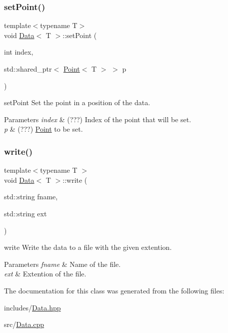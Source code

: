 \subsubsection{\texorpdfstring{set\+Point()}{setPoint()}}
{\footnotesize\ttfamily template$<$typename T$>$ \\
void \mbox{\hyperlink{class_data}{Data}}$<$ T $>$\+::set\+Point (\begin{DoxyParamCaption}\item[{int}]{index,  }\item[{std\+::shared\+\_\+ptr$<$ \mbox{\hyperlink{class_point}{Point}}$<$ T $>$ $>$}]{p }\end{DoxyParamCaption})}



set\+Point Set the point in a position of the data. 


\begin{DoxyParams}{Parameters}
{\em index} & (???) Index of the point that will be set. \\
\hline
{\em p} & (???) \mbox{\hyperlink{class_point}{Point}} to be set. \\
\hline
\end{DoxyParams}
\mbox{\label{class_data_a1f0bf8cc73e43cd6915289706abc46b2}} 
\subsubsection{\texorpdfstring{write()}{write()}}
{\footnotesize\ttfamily template$<$typename T $>$ \\
void \mbox{\hyperlink{class_data}{Data}}$<$ T $>$\+::write (\begin{DoxyParamCaption}\item[{std\+::string}]{fname,  }\item[{std\+::string}]{ext }\end{DoxyParamCaption})}



write Write the data to a file with the given extention. 


\begin{DoxyParams}{Parameters}
{\em fname} & Name of the file. \\
\hline
{\em ext} & Extention of the file. \\
\hline
\end{DoxyParams}


The documentation for this class was generated from the following files\+:\begin{DoxyCompactItemize}
\item 
includes/\mbox{\hyperlink{_data_8hpp}{Data.\+hpp}}\item 
src/\mbox{\hyperlink{_data_8cpp}{Data.\+cpp}}\end{DoxyCompactItemize}
